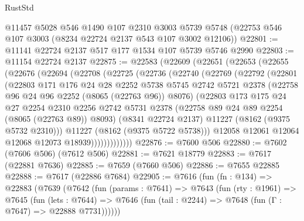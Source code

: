\begin{lexlean}{RustStd}
\begin{coremodule}
    @11457
    @5028
    @546
    @1490
    @107
    @2310
    @3003
    @5739
    @5748
    (@22753 @546 @107 @3003 (@8234 @22724 @2137 @543 @107 @3002 @12106))
@22801 := @11141 @22724 @2137 @517 @177 @1534 @107 @5739 @5746 @2990
@22803 := @11154 @22724 @2137
@22875 := @22583
    (@22609
      (@22651
        (@22653
          (@22655
            (@22676
              (@22694
                (@22708
                  (@22725
                    (@22736
                      (@22740
                        (@22769
                          (@22792
                            (@22801
                              (@22803
                                @171
                                @176
                                @24
                                @28
                                @2252
                                @5738
                                @5745
                                @2742
                                @5721
                                @2378
                                (@22758 @96 @24 @96 @2252 (@8065 (@22763 @96)) @8076)
                                (@22803
                                  @173
                                  @175
                                  @24
                                  @27
                                  @2254
                                  @2310
                                  @2256
                                  @2742
                                  @5731
                                  @2378
                                  (@22758 @89 @24 @89 @2254 (@8065 (@22763 @89)) @8093)
                                  (@8341 @22724 @2137)
                                  @11227
                                  (@8162 (@9375 @5732 @2310)))
                                @11227
                                (@8162 (@9375 @5722 @5738)))
                              @12058
                              @12061
                              @12064
                              @12068
                              @12073
                              @18939)))))))))))))
@22876 := @7600 @506
@22880 := @7602 (@7606 @506) (@7612 @506)
@22881 := @7621 @18779
@22883 := @7617 (@22881 @7636)
@22885 := @7659 (@7660 @506)
@22886 := @7655 @22885
@22888 := @7617 (@22886 @7684)
@22905 := @7616
    (fun (fn : @134) =>
    @22883
      (@7639
        (@7642
          (fun (params : @7641) =>
          @7643
            (fun (rty : @1961) =>
            @7645
              (fun (lets : @7644) =>
              @7646 (fun (tail : @2244) => @7648 (fun (Γ : @7647) => @22888 @7731))))))

\end{coremodule}
\end{lexlean}
